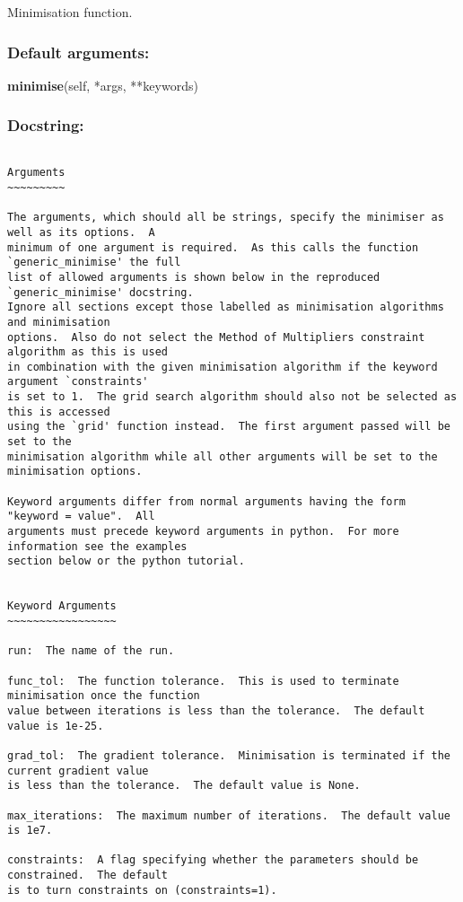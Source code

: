 Minimisation function.

\subsubsection{Default arguments:}

\textsf{\textbf{minimise}(self, *args, **keywords)
}


\subsubsection{Docstring:}

{\scriptsize
\begin{verbatim}

Arguments
~~~~~~~~~

The arguments, which should all be strings, specify the minimiser as well as its options.  A
minimum of one argument is required.  As this calls the function `generic_minimise' the full
list of allowed arguments is shown below in the reproduced `generic_minimise' docstring.
Ignore all sections except those labelled as minimisation algorithms and minimisation
options.  Also do not select the Method of Multipliers constraint algorithm as this is used
in combination with the given minimisation algorithm if the keyword argument `constraints'
is set to 1.  The grid search algorithm should also not be selected as this is accessed
using the `grid' function instead.  The first argument passed will be set to the
minimisation algorithm while all other arguments will be set to the minimisation options.

Keyword arguments differ from normal arguments having the form "keyword = value".  All
arguments must precede keyword arguments in python.  For more information see the examples
section below or the python tutorial.


Keyword Arguments
~~~~~~~~~~~~~~~~~

run:  The name of the run.

func_tol:  The function tolerance.  This is used to terminate minimisation once the function
value between iterations is less than the tolerance.  The default value is 1e-25.

grad_tol:  The gradient tolerance.  Minimisation is terminated if the current gradient value
is less than the tolerance.  The default value is None.

max_iterations:  The maximum number of iterations.  The default value is 1e7.

constraints:  A flag specifying whether the parameters should be constrained.  The default
is to turn constraints on (constraints=1).


\end{verbatim}}
